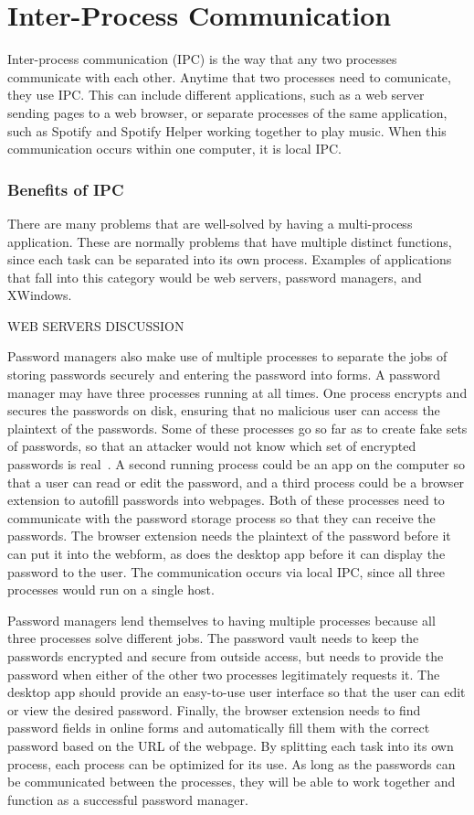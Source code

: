 \chapter{Inter-Process Communication}
\label{sec:interProcessCommunication}

Inter-process communication (IPC) is the way that any two processes communicate with each other.  Anytime that two processes need to comunicate, they use IPC.  This can include different applications, such as a web server sending pages to a web browser, or separate processes of the same application, such as Spotify and Spotify Helper working together to play music.  When this communication occurs within one computer, it is local IPC.


\subsection{Benefits of IPC}
There are many problems that are well-solved by having a multi-process application.  These are normally problems that have multiple distinct functions, since each task can be separated into its own process.  Examples of applications that fall into this category would be web servers, password managers, and XWindows.

WEB SERVERS DISCUSSION

Password managers also make use of multiple processes to separate the jobs of storing passwords securely and entering the password into forms.  A password manager may have three processes running at all times.  One process encrypts and secures the passwords on disk, ensuring that no malicious user can access the plaintext of the passwords.  Some of these processes go so far as to create fake sets of passwords, so that an attacker would not know which set of encrypted passwords is real~\cite{bojinov2010kamouflage}.  A second running process could be an app on the computer so that a user can read or edit the password, and a third process could be a browser extension to autofill passwords into webpages.  Both of these processes need to communicate with the password storage process so that they can receive the passwords.  The browser extension needs the plaintext of the password before it can put it into the webform, as does the desktop app before it can display the password to the user.  The communication occurs via local IPC, since all three processes would run on a single host.

Password managers lend themselves to having multiple processes because all three processes solve different jobs.  The password vault needs to keep the passwords encrypted and secure from outside access, but needs to provide the password when either of the other two processes legitimately requests it.  The desktop app should provide an easy-to-use user interface so that the user can edit or view the desired password.  Finally, the browser extension needs to find password fields in online forms and automatically fill them with the correct password based on the URL of the webpage.  By splitting each task into its own process, each process can be optimized for its use.  As long as the passwords can be communicated between the processes, they will be able to work together and function as a successful password manager.

